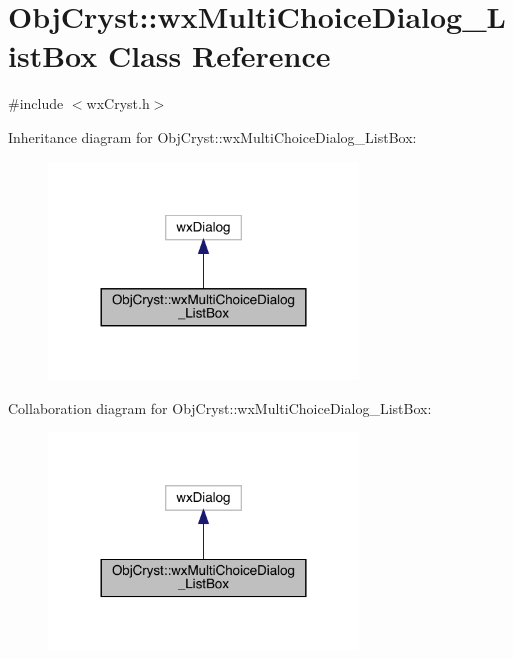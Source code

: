 \hypertarget{class_obj_cryst_1_1wx_multi_choice_dialog___list_box}{}\section{Obj\+Cryst\+::wx\+Multi\+Choice\+Dialog\+\_\+\+List\+Box Class Reference}
\label{class_obj_cryst_1_1wx_multi_choice_dialog___list_box}


{\ttfamily \#include $<$wx\+Cryst.\+h$>$}



Inheritance diagram for Obj\+Cryst\+::wx\+Multi\+Choice\+Dialog\+\_\+\+List\+Box\+:
\nopagebreak
\begin{figure}[H]
\begin{center}
\leavevmode
\includegraphics[width=233pt]{class_obj_cryst_1_1wx_multi_choice_dialog___list_box__inherit__graph}
\end{center}
\end{figure}


Collaboration diagram for Obj\+Cryst\+::wx\+Multi\+Choice\+Dialog\+\_\+\+List\+Box\+:
\nopagebreak
\begin{figure}[H]
\begin{center}
\leavevmode
\includegraphics[width=233pt]{class_obj_cryst_1_1wx_multi_choice_dialog___list_box__coll__graph}
\end{center}
\end{figure}
